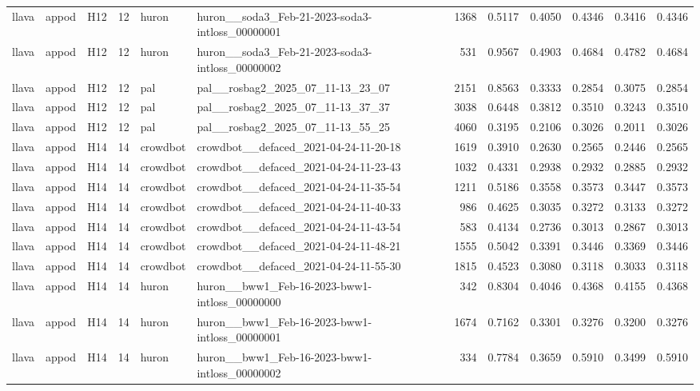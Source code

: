 \begin{table}[tbp]
\begin{tabular}{lllrllrrrrrr}
llava & appod & H12 & 12 & huron & huron\_\_soda3\_Feb-21-2023-soda3-intloss\_00000001 & 1368 & 0.5117 & 0.4050 & 0.4346 & 0.3416 & 0.4346 \\
llava & appod & H12 & 12 & huron & huron\_\_soda3\_Feb-21-2023-soda3-intloss\_00000002 & 531 & 0.9567 & 0.4903 & 0.4684 & 0.4782 & 0.4684 \\
llava & appod & H12 & 12 & pal & pal\_\_rosbag2\_2025\_07\_11-13\_23\_07 & 2151 & 0.8563 & 0.3333 & 0.2854 & 0.3075 & 0.2854 \\
llava & appod & H12 & 12 & pal & pal\_\_rosbag2\_2025\_07\_11-13\_37\_37 & 3038 & 0.6448 & 0.3812 & 0.3510 & 0.3243 & 0.3510 \\
llava & appod & H12 & 12 & pal & pal\_\_rosbag2\_2025\_07\_11-13\_55\_25 & 4060 & 0.3195 & 0.2106 & 0.3026 & 0.2011 & 0.3026 \\
llava & appod & H14 & 14 & crowdbot & crowdbot\_\_defaced\_2021-04-24-11-20-18 & 1619 & 0.3910 & 0.2630 & 0.2565 & 0.2446 & 0.2565 \\
llava & appod & H14 & 14 & crowdbot & crowdbot\_\_defaced\_2021-04-24-11-23-43 & 1032 & 0.4331 & 0.2938 & 0.2932 & 0.2885 & 0.2932 \\
llava & appod & H14 & 14 & crowdbot & crowdbot\_\_defaced\_2021-04-24-11-35-54 & 1211 & 0.5186 & 0.3558 & 0.3573 & 0.3447 & 0.3573 \\
llava & appod & H14 & 14 & crowdbot & crowdbot\_\_defaced\_2021-04-24-11-40-33 & 986 & 0.4625 & 0.3035 & 0.3272 & 0.3133 & 0.3272 \\
llava & appod & H14 & 14 & crowdbot & crowdbot\_\_defaced\_2021-04-24-11-43-54 & 583 & 0.4134 & 0.2736 & 0.3013 & 0.2867 & 0.3013 \\
llava & appod & H14 & 14 & crowdbot & crowdbot\_\_defaced\_2021-04-24-11-48-21 & 1555 & 0.5042 & 0.3391 & 0.3446 & 0.3369 & 0.3446 \\
llava & appod & H14 & 14 & crowdbot & crowdbot\_\_defaced\_2021-04-24-11-55-30 & 1815 & 0.4523 & 0.3080 & 0.3118 & 0.3033 & 0.3118 \\
llava & appod & H14 & 14 & huron & huron\_\_bww1\_Feb-16-2023-bww1-intloss\_00000000 & 342 & 0.8304 & 0.4046 & 0.4368 & 0.4155 & 0.4368 \\
llava & appod & H14 & 14 & huron & huron\_\_bww1\_Feb-16-2023-bww1-intloss\_00000001 & 1674 & 0.7162 & 0.3301 & 0.3276 & 0.3200 & 0.3276 \\
llava & appod & H14 & 14 & huron & huron\_\_bww1\_Feb-16-2023-bww1-intloss\_00000002 & 334 & 0.7784 & 0.3659 & 0.5910 & 0.3499 & 0.5910 \\

\end{tabular}
\end{table}
